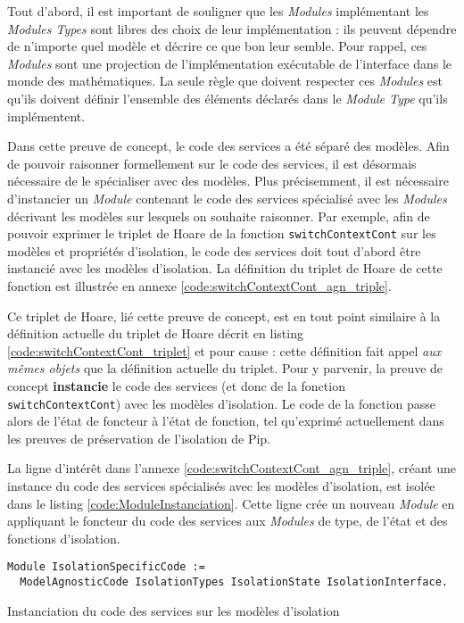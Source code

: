 		Tout d'abord, il est important de souligner que les \emph{Modules} implémentant les \emph{Modules Types} sont libres des choix de leur implémentation : ils peuvent dépendre de n'importe quel modèle et décrire ce que bon leur semble. Pour rappel, ces \emph{Modules} sont une projection de l'implémentation exécutable de l'interface dans le monde des mathématiques. La seule règle que doivent respecter ces \emph{Modules} est qu'ils doivent définir l'ensemble des éléments déclarés dans le \emph{Module Type} qu'ils implémentent.

		Dans cette preuve de concept, le code des services a été séparé des modèles. Afin de pouvoir raisonner formellement sur le code des services, il est désormais nécessaire de le spécialiser avec des modèles. Plus précisemment, il est nécessaire d'instancier un \emph{Module} contenant le code des services spécialisé avec les \emph{Modules} décrivant les modèles sur lesquels on souhaite raisonner. Par exemple, afin de pouvoir exprimer le triplet de Hoare de la fonction \texttt{switchContextCont} sur les modèles et propriétés d'isolation, le code des services doit tout d'abord être instancié avec les modèles d'isolation. La définition du triplet de Hoare de cette fonction est illustrée en annexe \ref{code:switchContextCont_agn_triple}.

		Ce triplet de Hoare, lié cette preuve de concept, est en tout point similaire à la définition actuelle du triplet de Hoare décrit en listing \ref{code:switchContextCont_triplet} et pour cause : cette définition fait appel \emph{aux mêmes objets} que la définition actuelle du triplet. Pour y parvenir, la preuve de concept \textbf{instancie} le code des services (et donc de la fonction \texttt{switchContextCont}) avec les modèles d'isolation. Le code de la fonction passe alors de l'état de foncteur à l'état de fonction, tel qu'exprimé actuellement dans les preuves de préservation de l'isolation de Pip.

		La ligne d'intérêt dans l'annexe \ref{code:switchContextCont_agn_triple}, créant une instance du code des services spécialisés avec les modèles d'isolation, est isolée dans le listing \ref{code:ModuleInstanciation}. Cette ligne crée un nouveau \emph{Module} en appliquant le foncteur du code des services aux \emph{Modules} de type, de l'état et des fonctions d'isolation.
	\begin{listing}[!ht]
	\begin{verbatim}
Module IsolationSpecificCode :=
  ModelAgnosticCode IsolationTypes IsolationState IsolationInterface.
	\end{verbatim}
	\caption{Instanciation du code des services sur les modèles d'isolation}
	\label{code:ModuleInstanciation}
	\end{listing}

